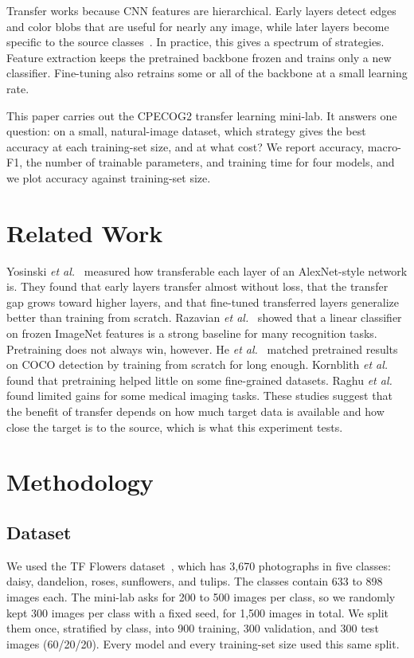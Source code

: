 \documentclass[journal]{IEEEtran}
\begin{document}
Transfer works because CNN features are hierarchical. Early layers detect edges and color blobs that are useful for nearly any image, while later layers become specific to the source classes~\cite{zeiler2014visualizing,yosinski2014transferable}. In practice, this gives a spectrum of strategies. Feature extraction keeps the pretrained backbone frozen and trains only a new classifier. Fine-tuning also retrains some or all of the backbone at a small learning rate.

This paper carries out the CPECOG2 transfer learning mini-lab. It answers one question: on a small, natural-image dataset, which strategy gives the best accuracy at each training-set size, and at what cost? We report accuracy, macro-F1, the number of trainable parameters, and training time for four models, and we plot accuracy against training-set size.

\section{Related Work}
Yosinski \textit{et al.}~\cite{yosinski2014transferable} measured how transferable each layer of an AlexNet-style network is. They found that early layers transfer almost without loss, that the transfer gap grows toward higher layers, and that fine-tuned transferred layers generalize better than training from scratch. Razavian \textit{et al.}~\cite{razavian2014cnn} showed that a linear classifier on frozen ImageNet features is a strong baseline for many recognition tasks. Pretraining does not always win, however. He \textit{et al.}~\cite{he2019rethinking} matched pretrained results on COCO detection by training from scratch for long enough. Kornblith \textit{et al.}~\cite{kornblith2019better} found that pretraining helped little on some fine-grained datasets. Raghu \textit{et al.}~\cite{raghu2019transfusion} found limited gains for some medical imaging tasks. These studies suggest that the benefit of transfer depends on how much target data is available and how close the target is to the source, which is what this experiment tests.

\section{Methodology}

\subsection{Dataset}
We used the TF Flowers dataset~\cite{tfflowers}, which has 3,670 photographs in five classes: daisy, dandelion, roses, sunflowers, and tulips. The classes contain 633 to 898 images each. The mini-lab asks for 200 to 500 images per class, so we randomly kept 300 images per class with a fixed seed, for 1,500 images in total. We split them once, stratified by class, into 900 training, 300 validation, and 300 test images (60/20/20). Every model and every training-set size used this same split.
\end{document}
